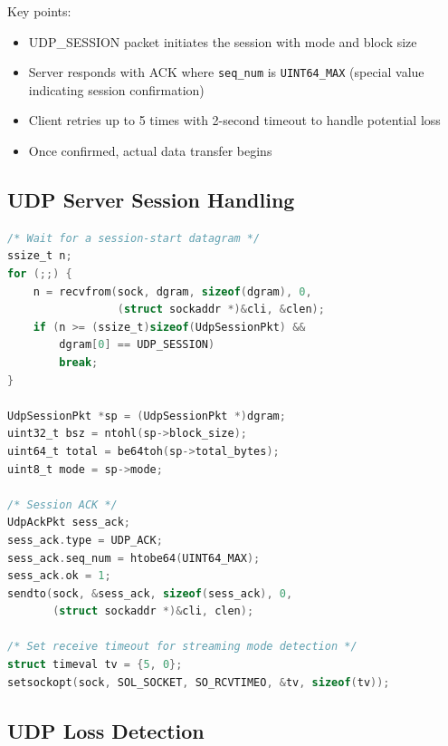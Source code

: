 \documentclass[12pt,a4paper]{article}
\begin{document}
Key points:
\begin{itemize}
  \item UDP\_SESSION packet initiates the session with mode and block size
  \item Server responds with ACK where \texttt{seq\_num} is \texttt{UINT64\_MAX} (special value indicating session confirmation)
  \item Client retries up to 5 times with 2-second timeout to handle potential loss
  \item Once confirmed, actual data transfer begins
\end{itemize}

\subsection{UDP Server Session Handling}

\begin{lstlisting}[caption=UDP Server: Session Handling,label=lst:udp_server_session,language=C]
/* Wait for a session-start datagram */
ssize_t n;
for (;;) {
    n = recvfrom(sock, dgram, sizeof(dgram), 0,
                 (struct sockaddr *)&cli, &clen);
    if (n >= (ssize_t)sizeof(UdpSessionPkt) &&
        dgram[0] == UDP_SESSION)
        break;
}

UdpSessionPkt *sp = (UdpSessionPkt *)dgram;
uint32_t bsz = ntohl(sp->block_size);
uint64_t total = be64toh(sp->total_bytes);
uint8_t mode = sp->mode;

/* Session ACK */
UdpAckPkt sess_ack;
sess_ack.type = UDP_ACK;
sess_ack.seq_num = htobe64(UINT64_MAX);
sess_ack.ok = 1;
sendto(sock, &sess_ack, sizeof(sess_ack), 0,
       (struct sockaddr *)&cli, clen);

/* Set receive timeout for streaming mode detection */
struct timeval tv = {5, 0};
setsockopt(sock, SOL_SOCKET, SO_RCVTIMEO, &tv, sizeof(tv));
\end{lstlisting}

\subsection{UDP Loss Detection}
\end{document}
